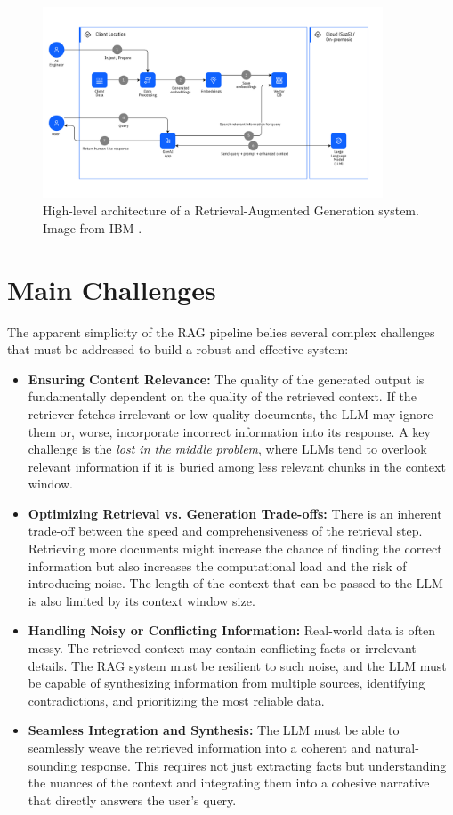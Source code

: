 \begin{figure}[!htbp]
    \centering
    \includegraphics[width=0.9\textwidth]{images/chapter2/rag_architecture.png}
    \caption{High-level architecture of a Retrieval-Augmented Generation system. Image from IBM \autocite{ibm-rag-pattern}.}
    \label{fig:rag_architecture}
\end{figure}

\section{Main Challenges}
The apparent simplicity of the RAG pipeline belies several complex challenges that must be addressed to build a robust and effective system:
\begin{itemize}
    \item \textbf{Ensuring Content Relevance:} The quality of the generated output is fundamentally dependent on the quality of the retrieved context. If the retriever fetches irrelevant or low-quality documents, the LLM may ignore them or, worse, incorporate incorrect information into its response. A key challenge is the \textit{lost in the middle problem}, where LLMs tend to overlook relevant information if it is buried among less relevant chunks in the context window.
    \item \textbf{Optimizing Retrieval vs. Generation Trade-offs:} There is an inherent trade-off between the speed and comprehensiveness of the retrieval step. Retrieving more documents might increase the chance of finding the correct information but also increases the computational load and the risk of introducing noise. The length of the context that can be passed to the LLM is also limited by its context window size.
    \item \textbf{Handling Noisy or Conflicting Information:} Real-world data is often messy. The retrieved context may contain conflicting facts or irrelevant details. The RAG system must be resilient to such noise, and the LLM must be capable of synthesizing information from multiple sources, identifying contradictions, and prioritizing the most reliable data.
    \item \textbf{Seamless Integration and Synthesis:} The LLM must be able to seamlessly weave the retrieved information into a coherent and natural-sounding response. This requires not just extracting facts but understanding the nuances of the context and integrating them into a cohesive narrative that directly answers the user's query.
\end{itemize}

